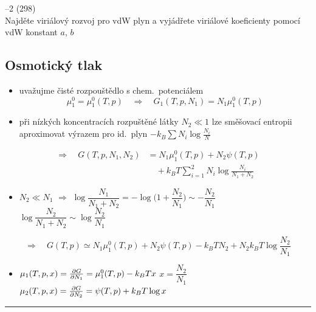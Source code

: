 \begin{center}
\color{Red}
\begin{minipage}{0.55\textwidth}
--2 (298) \\
Najděte viriálový rozvoj pro vdW plyn a vyjádřete viriálové koeficienty pomocí vdW konstant \underline{$a$}, \underline{$b$}
\end{minipage}
\end{center}

\subsection*{Osmotický tlak}
\begin{itemize}
  \item uvažujme čisté rozpouštědlo s chem.\ potenciálem
  \[
    \mu_1^0 = \mu_1^0(T,p) \quad\Rightarrow\quad G_1(T,p,N_1) = N_1\mu_1^0(T,p)
  \]
  \item při nízkých koncentracích rozpuštěné látky $N_2\ll 1$ lze směšovací entropii aproximovat výrazem pro id.\ plyn $-k_B\sum N_i\log\frac{N_i}{N}$
\end{itemize}
\begin{align*}
  \Rightarrow\quad G(T,p,N_1,N_2) &= N_1\mu_1^0(T,p) + N_2\psi(T,p) \\
  &\quad + k_BT\sum_{i=1}^{2}N_i\log\frac{N_i}{N_1+N_2}
\end{align*}
\begin{itemize}
  \item $N_2\ll N_1$ \quad $\Rightarrow$ \quad
        $\log\dfrac{N_1}{N_1+N_2} = -\log\Big(1 + \dfrac{N_2}{N_1}\Big) \sim -\dfrac{N_2}{N_1}$ \\[4pt]
        \phantom{$N_2\ll N_1$ \quad $\Rightarrow$ \quad}
        $\log\dfrac{N_2}{N_1+N_2} \sim \log\dfrac{N_2}{N_1}$
\end{itemize}
\[
  \Rightarrow\quad G(T,p) \simeq N_1\mu_1^0(T,p) + N_2\psi(T,p) - k_BTN_2 + N_2k_BT\log\frac{N_2}{N_1}
\]
\begin{itemize}
  \item $\mu_1(T,p,x) = \pdv{G}{N_1} = \mu_1^0(T,p) - k_BTx$ \hfill $x = \dfrac{N_2}{N_1}$ \\[3pt]
        $\mu_2(T,p,x) = \pdv{G}{N_2} = \psi(T,p) + k_BT\log x$ \quad {}
\end{itemize}
\noindent\rule{0.75\linewidth}{0.4pt}


